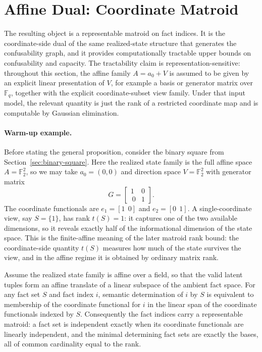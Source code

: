 \section{Affine Dual: Coordinate Matroid}\label{sec:affine}

The resulting object is a representable matroid on fact indices. It is the coordinate-side dual of the same realized-state structure that generates the confusability graph, and it provides computationally tractable upper bounds on confusability and capacity. The tractability claim is representation-sensitive: throughout this section, the affine family $A=a_0+V$ is assumed to be given by an explicit linear presentation of $V$, for example a basis or generator matrix over $\mathbb F_q$, together with the explicit coordinate-subset view family. Under that input model, the relevant quantity is just the rank of a restricted coordinate map and is computable by Gaussian elimination.

\paragraph{Warm-up example.}
Before stating the general proposition, consider the binary square from Section~\ref{sec:binary-square}. Here the realized state family is the full affine space $A=\mathbb F_2^2$, so we may take $a_0=(0,0)$ and direction space $V=\mathbb F_2^2$ with generator matrix
\[
G = \begin{bmatrix}1 & 0 \\\ 0 & 1\end{bmatrix}.
\]
The coordinate functionals are $e_1=[1\ \ 0]$ and $e_2=[0\ \ 1]$. A single-coordinate view, say $S=\{1\}$, has rank $t(S)=1$: it captures one of the two available dimensions, so it reveals exactly half of the informational dimension of the state space. This is the finite-affine meaning of the later matroid rank bound: the coordinate-side quantity $t(S)$ measures how much of the state survives the view, and in the affine regime it is obtained by ordinary matrix rank.

\begin{proposition}\label{thm:affine-fact-matroid}
Assume the realized state family is affine over a field, so that the valid latent tuples form an affine translate of a linear subspace of the ambient fact space. For any fact set $S$ and fact index $i$, semantic determination of $i$ by $S$ is equivalent to membership of the coordinate functional for $i$ in the linear span of the coordinate functionals indexed by $S$. Consequently the fact indices carry a representable matroid: a fact set is independent exactly when its coordinate functionals are linearly independent, and the minimal determining fact sets are exactly the bases, all of common cardinality equal to the rank.
\end{proposition}

